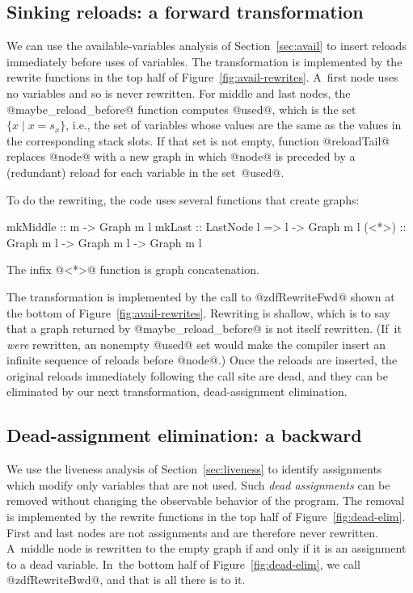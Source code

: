\documentclass[blockstyle,preprint,nocopyrightspace]{sigplanconf}
\newcommand\slotof[1]{\ensuremath{s_{#1}}}
\newcommand{\authornote}[1]{{\em #1}}
\def\authornote#1{\unskip\relax}
\newcommand{\norman}[1]{\authornote{NR: #1}}
\let\remark\norman
\newcommand{\john}[1]{\authornote{JD: #1}}
\newcommand\secref[1]{Section~\ref{sec:#1}}
\newcommand\seclabel[1]{\label{sec:#1}}
\newcommand\figref[1]{Figure~\ref{fig:#1}}
\begin{document}
\subsection{Sinking reloads: a forward transformation}

\seclabel{sink-reloads}

We can use the available-variables analysis of \secref{avail} to
insert reloads
immediately before uses of variables.
The transformation is implemented by the rewrite functions in the top
half of \figref{avail-rewrites}.
A~first node uses no variables and so is never rewritten.
For middle and last nodes, the @maybe_reload_before@ function
computes @used@, which is the set $\{ x \mid x = \slotof x\}$, i.e., 
the set of variables whose values are the same as the values in the
corresponding stack slots.
If that set is not empty, function
@reloadTail@ replaces @node@ with a new graph in which @node@ is
preceded by a (redundant) reload for each variable in the set~@used@.

To do the rewriting, the code uses several functions that create
graphs:
\begin{code}
mkMiddle ::               m -> Graph m l
mkLast   :: LastNode l => l -> Graph m l
(<*>)    :: Graph m l -> Graph m l -> Graph m l
\end{code}
The infix @<*>@ function is graph concatenation.

The transformation is implemented by the call to @zdfRewriteFwd@
shown at the bottom of \figref{avail-rewrites}.
Rewriting is shallow, which is to say that a graph returned by
@maybe_reload_before@ is not itself rewritten.
(If~it \emph{were} rewritten, an nonempty @used@ set would make the
compiler insert an infinite sequence of reloads before @node@.)
Once the reloads are inserted, the original reloads immediately
following the call site are dead, and they can be eliminated by our
next transformation, dead-assignment elimination.

\subsection{Dead-assignment elimination: a backward }

\seclabel{dead-code-elimination}
\seclabel{dead-code-elim}

\seclabel{bwd-rewrite}


\def\liveout{$\mathit{live_{out}}$}

We use the liveness analysis of \secref{liveness} to identify
assignments which modify only variables that are not used.
Such \emph{dead assignments} can be removed without changing the
observable behavior of the program.
The removal is implemented by the rewrite functions in the top half of
\figref{dead-elim}. 
First and last nodes are not assignments and are therefore never
rewritten.
A~middle node is rewritten to the empty graph if and only if it is an
assignment to a dead variable.
In~the bottom half of \figref{dead-elim}, we call @zdfRewriteBwd@, and
that is all there is to it.
\john{Need to run this version of the code in anger.}
%
\remark{In this space we should have some guff about
composing transformations, which should refer to the example on
eliminating the induction variable.}
\end{document}
